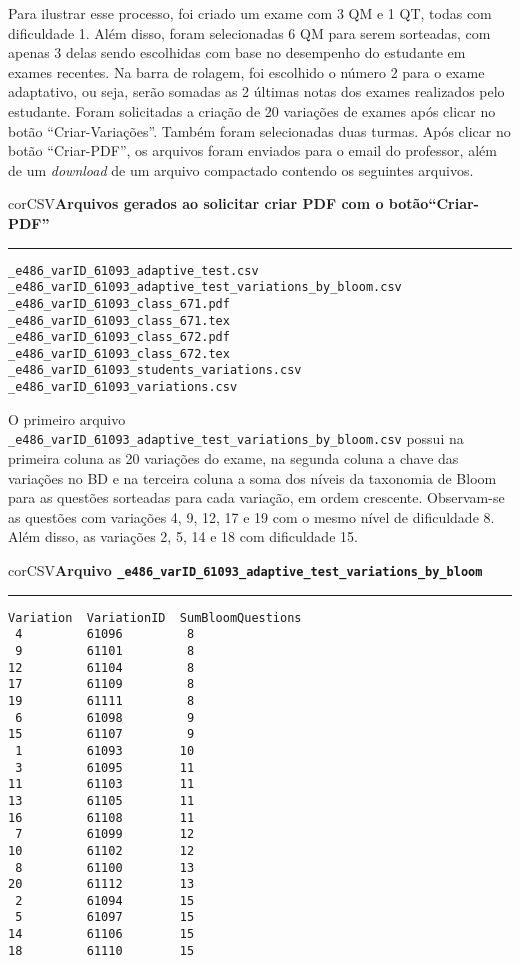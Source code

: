 Para ilustrar esse processo, foi criado um exame com 3 QM e 1 QT, todas com dificuldade 1. Além disso, foram selecionadas 6 QM para serem sorteadas, com apenas 3 delas sendo escolhidas com base no desempenho do estudante em exames recentes. Na barra de rolagem, foi escolhido o número 2 para o exame adaptativo, ou seja, serão somadas as 2 últimas notas dos exames realizados pelo estudante. Foram solicitadas a criação de 20 variações de exames após clicar no botão ``Criar-Variações''. Também foram selecionadas duas turmas. Após clicar no botão ``Criar-PDF'', os arquivos foram enviados para o email do professor, além de um \textit{download} de um arquivo compactado contendo os seguintes arquivos.

\begin{myboxCode}{corCSV}{\textbf{Arquivos gerados ao solicitar criar PDF com o botão``Criar-PDF''}}\vspace{3mm}
\hrule
\begin{verbatim}
_e486_varID_61093_adaptive_test.csv
_e486_varID_61093_adaptive_test_variations_by_bloom.csv
_e486_varID_61093_class_671.pdf
_e486_varID_61093_class_671.tex
_e486_varID_61093_class_672.pdf
_e486_varID_61093_class_672.tex
_e486_varID_61093_students_variations.csv
_e486_varID_61093_variations.csv
\end{verbatim}
\end{myboxCode}

O primeiro arquivo \verb|_e486_varID_61093_adaptive_test_variations_by_bloom.csv| possui na primeira coluna as 20 variações do exame, na segunda coluna a chave das variações no BD e na terceira coluna a soma dos níveis da taxonomia de Bloom para as questões sorteadas para cada variação, em ordem crescente. Observam-se as questões com variações 4, 9, 12, 17 e 19 com o mesmo nível de dificuldade 8. Além disso, as variações 2, 5, 14 e 18 com dificuldade 15.


\begin{myboxCode}{corCSV}{\textbf{Arquivo \texttt{\_e486\_varID\_61093\_adaptive\_test\_variations\_by\_bloom}}}\vspace{3mm}
\hrule
\begin{verbatim}
Variation  VariationID  SumBloomQuestions
 4         61096         8
 9         61101         8
12         61104         8
17         61109         8
19         61111         8
 6         61098         9
15         61107         9
 1         61093        10
 3         61095        11
11         61103        11
13         61105        11
16         61108        11
 7         61099        12
10         61102        12
 8         61100        13
20         61112        13
 2         61094        15
 5         61097        15
14         61106        15
18         61110        15
\end{verbatim}
\end{myboxCode}



